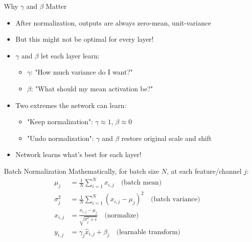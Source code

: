 \begin{frame}{Why $\gamma$ and $\beta$ Matter}
    \begin{itemize}
        \item After normalization, outputs are always zero-mean, unit-variance
        \item But this might not be optimal for every layer!
        \item $\gamma$ and $\beta$ let each layer learn:
        \begin{itemize}
            \item $\gamma$: "How much variance do I want?"
            \item $\beta$: "What should my mean activation be?"
        \end{itemize}
        \item Two extremes the network can learn:
        \begin{itemize}
            \item "Keep normalization": $\gamma \approx 1$, $\beta \approx 0$
            \item "Undo normalization": $\gamma$ and $\beta$ restore original scale and shift
        \end{itemize}
        \item Network learns what's best for each layer!
    \end{itemize}
\end{frame}

\begin{frame}{Batch Normalization}
    Mathematically, for batch size $N$, at each feature/channel $j$:
    \[
    \begin{aligned}
    \mu_j &= \frac{1}{N}\sum_{i=1}^N x_{i,j} \quad \text{(batch mean)} \\
    \sigma^2_j &= \frac{1}{N}\sum_{i=1}^N (x_{i,j} - \mu_j)^2 \quad \text{(batch variance)} \\
    \hat{x}_{i,j} &= \frac{x_{i,j} - \mu_j}{\sqrt{\sigma^2_j + \epsilon}} \quad \text{(normalize)} \\
    y_{i,j} &= \gamma_j\hat{x}_{i,j} + \beta_j \quad \text{(learnable transform)}
    \end{aligned}
    \]
\end{frame}

